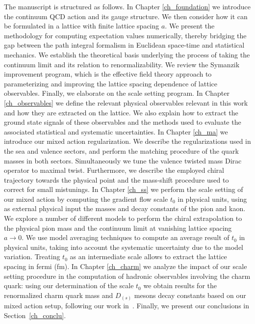 The manuscript is structured as follows. In Chapter \ref{ch_foundation} we introduce the continuum QCD action and its gauge structure. We then consider how it can be formulated in a lattice with finite lattice spacing $a$. We present the methodology for computing expectation values numerically, thereby bridging the gap between the path integral formalism in Euclidean space-time and statistical mechanics. We establish the theoretical basis underlying the process of taking the continuum limit and its relation to renormalizability. We review the Symanzik improvement program, which is the effective field theory approach to parameterizing and improving the lattice spacing dependence of lattice observables. Finally, we elaborate on the scale setting program. In Chapter \ref{ch_observables} we define the relevant physical observables relevant in this work and how they are extracted on the lattice. We also explain how to extract the ground state signals of these observables and the methods used  to evaluate the associated statistical and systematic uncertainties. In Chapter \ref{ch_ma} we introduce our mixed action regularization. We describe the regularizations used in the sea and valence sectors, and perform the matching procedure of the quark masses in both sectors. Simultaneously we tune the valence twisted mass Dirac operator to maximal twist. Furthermore, we describe the employed chiral trajectory towards the physical point and the mass-shift procedure used to correct for small mistunings. In Chapter \ref{ch_ss} we perform the scale setting of our mixed action by computing the gradient flow scale $t_0$ in physical units, using as external physical input the masses and decay constants of the pion and kaon. We explore a number of different models to perform the chiral extrapolation to the physical pion mass and the continuum limit at vanishing lattice spacing $a\to0$. We use model averaging techniques to compute an average result of $t_0$ in physical units, taking into account the systematic uncertainty due to the model variation. Treating $t_0$ as an intermediate scale allows to extract the lattice spacing in fermi (fm). In Chapter \ref{ch_charm} we analyze the impact of our scale setting procedure in the computation of hadronic observables involving the charm quark: using our determination of the scale $t_0$ we obtain results for the renormalized charm quark mass and $D_{(s)}$ mesons decay constants based on our mixed action setup, following our work in~\citep{charm}. Finally, we present our conclusions in Section~\ref{ch_conclu}.

